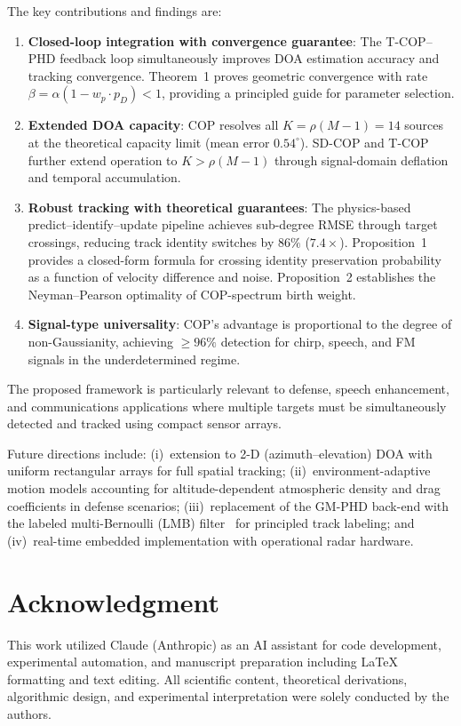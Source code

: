 \documentclass[journal]{IEEEtran}
\begin{document}
The key contributions and findings are:
\begin{enumerate}
\item \textbf{Closed-loop integration with convergence guarantee}: The T-COP--PHD feedback loop simultaneously improves DOA estimation accuracy and tracking convergence. Theorem~1 proves geometric convergence with rate $\beta = \alpha(1 - w_p \cdot p_D) < 1$, providing a principled guide for parameter selection.
\item \textbf{Extended DOA capacity}: COP resolves all $K{=}\rho(M{-}1){=}14$ sources at the theoretical capacity limit (mean error $0.54^\circ$). SD-COP and T-COP further extend operation to $K > \rho(M{-}1)$ through signal-domain deflation and temporal accumulation.
\item \textbf{Robust tracking with theoretical guarantees}: The physics-based predict--identify--update pipeline achieves sub-degree RMSE through target crossings, reducing track identity switches by $86\%$ ($7.4\times$). Proposition~1 provides a closed-form formula for crossing identity preservation probability as a function of velocity difference and noise. Proposition~2 establishes the Neyman--Pearson optimality of COP-spectrum birth weight.
\item \textbf{Signal-type universality}: COP's advantage is proportional to the degree of non-Gaussianity, achieving $\geq 96\%$ detection for chirp, speech, and FM signals in the underdetermined regime.
\end{enumerate}

The proposed framework is particularly relevant to defense, speech enhancement, and communications applications where multiple targets must be simultaneously detected and tracked using compact sensor arrays.

Future directions include: (i)~extension to 2-D (azimuth--elevation) DOA with uniform rectangular arrays for full spatial tracking; (ii)~environment-adaptive motion models accounting for altitude-dependent atmospheric density and drag coefficients in defense scenarios; (iii)~replacement of the GM-PHD back-end with the labeled multi-Bernoulli (LMB) filter~\cite{vo2014lmb} for principled track labeling; and (iv)~real-time embedded implementation with operational radar hardware.

\section*{Acknowledgment}
This work utilized Claude (Anthropic) as an AI assistant for code development, experimental automation, and manuscript preparation including \LaTeX{} formatting and text editing. All scientific content, theoretical derivations, algorithmic design, and experimental interpretation were solely conducted by the authors.



\end{document}

